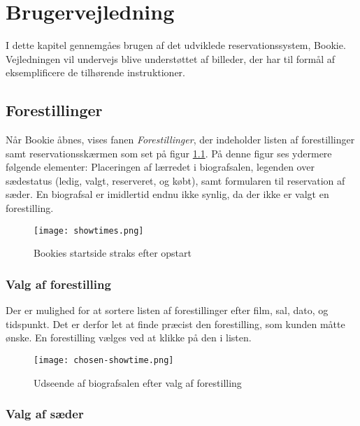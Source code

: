 \chapter{Brugervejledning}

I dette kapitel gennemgåes brugen af det udviklede reservationssystem, Bookie. Vejledningen vil undervejs blive understøttet af billeder, der har til formål af eksemplificere de tilhørende instruktioner.

\section{Forestillinger}

Når Bookie åbnes, vises fanen \textit{Forestillinger}, der indeholder listen af forestillinger samt reservationsskærmen som set på figur \ref{screenshot:bookie}. På denne figur ses ydermere følgende elementer: Placeringen af lærredet i biografsalen, legenden over sædestatus (ledig, valgt, reserveret, og købt), samt formularen til reservation af sæder. En biografsal er imidlertid endnu ikke synlig, da der ikke er valgt en forestilling.

\begin{figure}[h]
  \centering
  \texttt{[image: showtimes.png]}
  \caption{Bookies startside straks efter opstart}
  \label{screenshot:bookie}
\end{figure}

\subsection{Valg af forestilling}

Der er mulighed for at sortere listen af forestillinger efter film, sal, dato, og tidspunkt. Det er derfor let at finde præcist den forestilling, som kunden måtte ønske. En forestilling vælges ved at klikke på den i listen.


\begin{figure}[h]
  \centering
  \texttt{[image: chosen-showtime.png]}
  \caption{Udseende af biografsalen efter valg af forestilling}
  \label{screenshot:chosen-showtime}
\end{figure}

\subsection{Valg af sæder}

